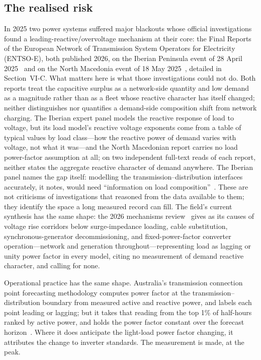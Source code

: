 \documentclass[journal]{IEEEtran}
\begin{document}
\subsection{The realised risk}
In 2025 two power systems suffered major blackouts whose official investigations
found a leading-reactive/overvoltage mechanism at their core: the Final Reports
of the European Network of Transmission System Operators for Electricity
(ENTSO-E), both published 2026, on the Iberian Peninsula event of 28 April
2025~\cite{entsoe_iberia} and on the North Macedonia event of 18 May
2025~\cite{entsoe_nm}, detailed in Section~VI-C. What matters here is what those
investigations could not do. Both reports treat the capacitive surplus as a
network-side quantity and low demand as a magnitude rather than
as a fleet whose reactive character has itself changed; neither distinguishes nor
quantifies a demand-side composition shift from network charging. The Iberian expert panel models the reactive response of load to voltage, but its load model's
reactive voltage exponents come from a table of typical values by load
class---how the reactive power of demand varies with voltage, not what it
was---and the North Macedonian report carries no load power-factor assumption
at all; on two independent full-text reads of each report, neither states the
aggregate reactive character of demand anywhere. The Iberian panel names the gap itself: modelling the transmission--distribution interfaces accurately, it notes, would need ``information on load composition''~\cite{entsoe_iberia}. These are not criticisms of
investigations that reasoned from the data available to them; they identify the
space a long measured record can fill. The field's current synthesis has the
same shape: the 2026 mechanisms review~\cite{vournas2026review} gives as its
causes of voltage rise corridors below surge-impedance loading, cable
substitution, synchronous-generator decommissioning, and fixed-power-factor
converter operation---network and generation throughout---representing load as
lagging or unity power factor in every model, citing no measurement of demand
reactive character, and calling for none.

Operational practice has the same shape. Australia's transmission connection
point forecasting methodology computes power factor at the
transmission--distribution boundary from measured active and reactive power, and
labels each point leading or lagging; but it takes that reading from the top
1\% of half-hours ranked by active power, and holds the power factor constant
over the forecast horizon~\cite{aemo_tcpf}. Where it does anticipate the
light-load power factor changing, it attributes the change to inverter
standards. The measurement is made, at the peak.
\end{document}
